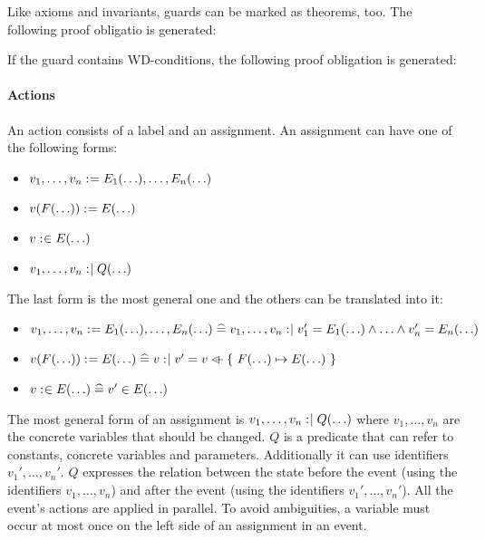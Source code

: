 Like axioms and invariants, guards can be marked as theorems, too. The following
proof obligatio is generated:

If the guard contains WD-conditions, the following proof obligation is generated:

\paragraph{Actions}
An action consists of a label and an assignment.
An assignment can have one of the following forms:
\begin{itemize}
\item $v_1,\ldots,v_n \mathrel{:\mkern1mu=} E_1(\ldots),\ldots,E_n(\ldots)$
\item $v(F(\ldots)) \mathrel{:\mkern1mu=} E(\ldots)$
\item $v \mathrel{:\mkern1mu\in} E(\ldots)$
\item $v_1,\ldots,v_n \mathrel{:\mkern1mu\mid} Q(\ldots)$
\end{itemize}
The last form is the most general one and the others can be translated into it:
\begin{itemize}
\item $v_1,\ldots,v_n \mathrel{:\mkern1mu=} E_1(\ldots),\ldots,E_n(\ldots) \mathrel{\widehat=} v_1,\ldots,v_n \mathrel{:\mkern1mu\mid} v_1' = E_1(\ldots) \land \ldots \land v_n' = E_n(\ldots)$
\item $v(F(\ldots)) \mathrel{:\mkern1mu=} E(\ldots) \mathrel{\widehat=} v \mathrel{:\mkern1mu\mid} v' = v \mathbin{\lhd\mkern-9mu-} \{~F(\ldots) \mapsto E(\ldots)~\}$
\item $v \mathrel{:\mkern1mu\in} E(\ldots) \mathrel{\widehat=} v' \in E(\ldots)$
\end{itemize}

 The most general form of an assignment
 is $v_1,\ldots,v_n \mathrel{:\mkern1mu\mid} Q(\ldots)$ where $v_1,\ldots,v_n$ are the concrete variables that should be changed.
$Q$ is a predicate that can refer to constants, concrete variables and parameters. 
Additionally it can use identifiers $v_1',\ldots,v_n'$. 
$Q$ expresses the relation between the state before the
event (using the identifiers $v_1,\ldots,v_n$) and after the event 
(using the identifiers $v_1',\ldots,v_n'$).
All the event's actions are applied in parallel. To avoid ambiguities, a variable must occur
at most once on the left side of an assignment in an event.



